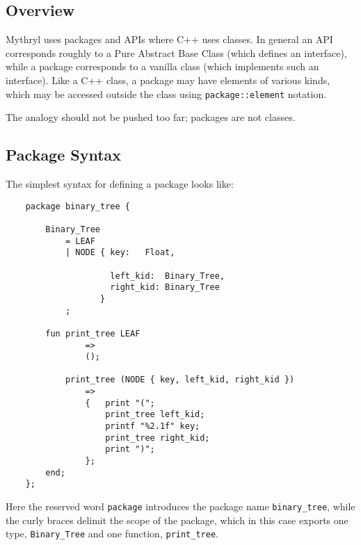 
\subsection{Overview}
\label{section:ref:packages-and-apis:overview}

Mythryl uses packages and APIs where C++ uses classes.  In general 
an API corresponds roughly to a Pure Abstract Base Class (which 
defines an interface), while a package corresponds to a vanilla 
class (which implements such an interface).  Like a C++ class, 
a package may have elements of various kinds, which may be 
accessed outside the class using {\tt package::element} notation.

The analogy should not be pushed too far;  packages are not 
classes.

\cutend*


\subsection{Package Syntax}
\label{section:ref:packages-syntax}

The simplest syntax for defining a package looks like:

\begin{verbatim}
    package binary_tree {

        Binary_Tree
            = LEAF
            | NODE { key:   Float,

                     left_kid:  Binary_Tree,
                     right_kid: Binary_Tree
                   }
            ;

        fun print_tree LEAF
                =>
                ();

            print_tree (NODE { key, left_kid, right_kid })
                =>
                {   print "(";
                    print_tree left_kid;
                    printf "%2.1f" key;
                    print_tree right_kid;
                    print ")";
                };
        end;
    };
\end{verbatim}

Here the reserved word {\tt package} introduces the package name {\tt binary\_tree}, 
while the curly braces delimit the scope of the package, which in this case 
exports one type, {\tt Binary\_Tree} and one function, {\tt print\_tree}. 

